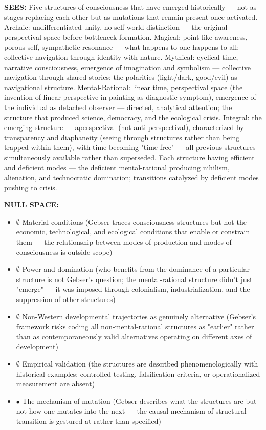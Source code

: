 \textbf{SEES:} Five structures of consciousness that have emerged historically — not as stages replacing each other but as mutations that remain present once activated. Archaic: undifferentiated unity, no self-world distinction — the original perspectival space before bottleneck formation. Magical: point-like awareness, porous self, sympathetic resonance — what happens to one happens to all; collective navigation through identity with nature. Mythical: cyclical time, narrative consciousness, emergence of imagination and symbolism — collective navigation through shared stories; the polarities (light/dark, good/evil) as navigational structure. Mental-Rational: linear time, perspectival space (the invention of linear perspective in painting as diagnostic symptom), emergence of the individual as detached observer — directed, analytical attention; the structure that produced science, democracy, and the ecological crisis. Integral: the emerging structure — aperspectival (not anti-perspectival), characterized by transparency and diaphaneity (seeing through structures rather than being trapped within them), with time becoming "time-free" — all previous structures simultaneously available rather than superseded. Each structure having efficient and deficient modes — the deficient mental-rational producing nihilism, alienation, and technocratic domination; transitions catalyzed by deficient modes pushing to crisis.


\textbf{NULL SPACE:}

\begin{itemize}[nosep,leftmargin=*]
  \item $\emptyset$ Material conditions (Gebser traces consciousness structures but not the economic, technological, and ecological conditions that enable or constrain them — the relationship between modes of production and modes of consciousness is outside scope)
  \item $\emptyset$ Power and domination (who benefits from the dominance of a particular structure is not Gebser's question; the mental-rational structure didn't just "emerge" — it was imposed through colonialism, industrialization, and the suppression of other structures)
  \item $\emptyset$ Non-Western developmental trajectories as genuinely alternative (Gebser's framework risks coding all non-mental-rational structures as "earlier" rather than as contemporaneously valid alternatives operating on different axes of development)
  \item $\emptyset$ Empirical validation (the structures are described phenomenologically with historical examples; controlled testing, falsification criteria, or operationalized measurement are absent)
  \item $\bullet$ The mechanism of mutation (Gebser describes what the structures are but not how one mutates into the next — the causal mechanism of structural transition is gestured at rather than specified)
\end{itemize}


